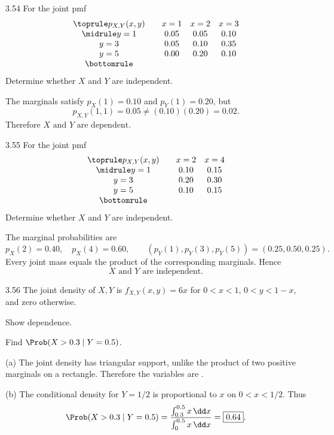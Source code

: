 \documentclass[11pt,oneside]{article}
\begin{document}
\begin{exercise}{3.54}
For the joint pmf
\[
\begin{array}{c@{\qquad}ccc}\toprule
p_{X,Y}(x,y)&x=1&x=2&x=3\\\midrule
y=1&0.05&0.05&0.10\\
y=3&0.05&0.10&0.35\\
y=5&0.00&0.20&0.10\\\bottomrule
\end{array}
\]
Determine whether $X$ and $Y$ are independent.
\end{exercise}

\begin{solution}
The marginals satisfy $p_X(1)=0.10$ and $p_Y(1)=0.20$, but
\[
p_{X,Y}(1,1)=0.05\ne(0.10)(0.20)=0.02.
\]
Therefore $\boxed{X\text{ and }Y\text{ are dependent}}$.
\end{solution}

\begin{exercise}{3.55}
For the joint pmf
\[
\begin{array}{c@{\qquad}cc}\toprule
p_{X,Y}(x,y)&x=2&x=4\\\midrule
y=1&0.10&0.15\\
y=3&0.20&0.30\\
y=5&0.10&0.15\\\bottomrule
\end{array}
\]
Determine whether $X$ and $Y$ are independent.
\end{exercise}

\begin{solution}
The marginal probabilities are
\[
p_X(2)=0.40,\quad p_X(4)=0.60,
\qquad (p_Y(1),p_Y(3),p_Y(5))=(0.25,0.50,0.25).
\]
Every joint mass equals the product of the corresponding marginals. Hence
\[\boxed{X\text{ and }Y\text{ are independent}.}\]
\end{solution}

\begin{exercise}{3.56}
The joint density of $X,Y$ is $f_{X,Y}(x,y)=6x$ for $0<x<1$, $0<y<1-x$, and zero otherwise.
\begin{exercisesubparts}
\item Show dependence.
\item Find $\Prob(X>0.3\mid Y=0.5)$.
\end{exercisesubparts}
\end{exercise}

\begin{solution}
\textup{(a)} The joint density has triangular support, unlike the product of two positive marginals on a rectangle. Therefore the variables are .\par\medskip
\noindent\textup{(b)} The conditional density for $Y=1/2$ is proportional to $x$ on $0<x<1/2$. Thus
\[
\Prob(X>0.3\mid Y=0.5)
=\frac{\int_{0.3}^{0.5}x\,\dd x}{\int_0^{0.5}x\,\dd x}
=\boxed{0.64}.
\]
\end{solution}
\end{document}
